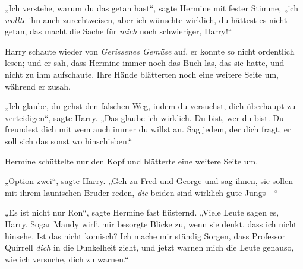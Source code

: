 „Ich verstehe, warum du das getan hast“, sagte Hermine mit fester Stimme, „ich \emph{wollte} ihn auch zurechtweisen, aber ich wünschte wirklich, du hättest es nicht getan, das macht die Sache für \emph{mich} noch schwieriger, Harry!“

Harry schaute wieder von \emph{Gerissenes Gemüse} auf, er konnte so nicht ordentlich lesen; und er sah, dass Hermine immer noch das Buch las, das sie hatte, und nicht zu ihm aufschaute. Ihre Hände blätterten noch eine weitere Seite um, während er zusah.

„Ich glaube, du gehst den falschen Weg, indem du versuchst, dich überhaupt zu verteidigen“, sagte Harry.
„Das glaube ich wirklich. Du bist, wer du bist. Du freundest dich mit wem auch immer du willst an. Sag jedem, der dich fragt, er soll sich das sonst wo hinschieben.“

Hermine schüttelte nur den Kopf und blätterte eine weitere Seite um.

„Option zwei“, sagte Harry.
„Geh zu Fred und George und sag ihnen, sie sollen mit ihrem launischen Bruder reden, \emph{die} beiden sind wirklich gute Jungs—“

„Es ist nicht nur Ron“, sagte Hermine fast flüsternd.
„Viele Leute sagen es, Harry. Sogar Mandy wirft mir besorgte Blicke zu, wenn sie denkt, dass ich nicht hinsehe. Ist das nicht komisch? Ich mache mir ständig Sorgen, dass Professor Quirrell \emph{dich} in die Dunkelheit zieht, und jetzt warnen mich die Leute genauso, wie ich versuche, dich zu warnen.“

